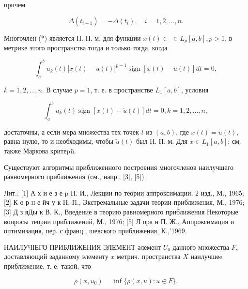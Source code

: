 \documentclass[10pt]{article}
\begin{document}
причем



\[

\Delta\left(t_{i+1}\right)=-\Delta\left(t_{i}\right), \quad i=1,2, \ldots, n .

\]



Многочлен (*) является Н. П. м. для функции $x(t) \in$ $\in L_{p}[a, b], p>1$, в метрике этого пространства тогда и только тогда, когда



\[

\int_{a}^{b} u_{k}(t)|x(t)-\tilde{u}(t)|^{p-1} \operatorname{sign}[x(t)-\tilde{u}(t)] d t=0,

\]



$k=1,2, \ldots, n$. В случае $p=1$, т. е. в пространстве $L_{1}[a, b]$, условия



\[

\int_{a}^{b} u_{k}(t) \operatorname{sign}[x(t)-\tilde{u}(t)] d t=0, k=1,2, \ldots, n,

\]



достаточны, а если мера множества тех точек $t$ из $(a, b)$, где $x(t)=\tilde{u}(t)$, равна нулю, то и необходимы, чтобы $\tilde{u}(t)$ был Н. П. м. Для $x \in L_{1}[a, b]$; см. также Маркова критеpü̆.



Существуют алгоритмы приближенного построения многочленов наилучшего равномерного приближения (см., напр., [3], [5]).



Лит.: [1] А х и е з е p Н. И., Лекции по теории аппроксимации, 2 изд., М., 1965; [2] К о р н е йч у к Н. П., Экстремальные задачи теории приближения, М., 1976; [3] Д з яДы к В. К., Введение в теорию равномерного приближения Некоторые вопросы теории приближений, М., 1976; [5] Л ора н П. Ж., Аппроксимация и оптимизация, пер. с франц., шевского приближения, К.,'1969.



НАИЛУЧІЕГО ПРИБЛИЖЕНИЯ ЭЛЕМЕНТ әлемент $U_{0}$ данного множества $F$, доставляющий заданному элементу $x$ метрич. пространства $X$ наилучшеe приближение, т. е. такой, что



\[

\rho\left(x, u_{0}\right)=\inf \{\rho(x, u): u \in F\} .

\]
\end{document}
